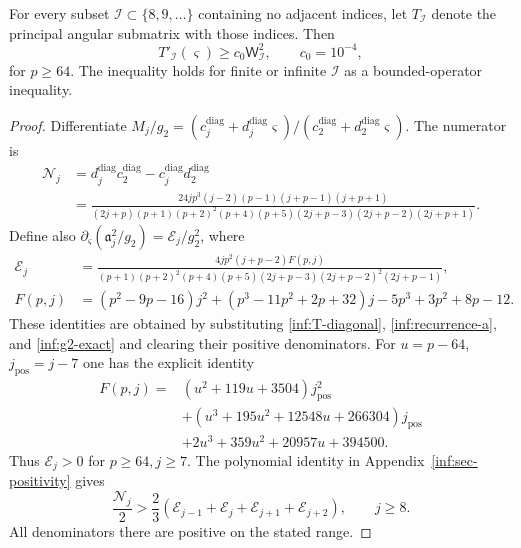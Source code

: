 \begin{lemma}\label{inf:angular-positive}
For every subset $\mathcal I\subset\{8,9,\ldots\}$ containing no
adjacent indices, let $T_{\mathcal I}$ denote the principal angular
submatrix with those indices. Then
\begin{equation}\label{inf:angular-positive-bound}
 T'_{\mathcal I}(\varsigma)\ge c_0\mathsf W_{\mathcal I}^2,
 \qquad c_0=10^{-4},
\end{equation}
for $p\ge64$. The inequality holds for
finite or infinite $\mathcal I$ as a bounded-operator inequality.
\end{lemma}
\begin{proof}
Differentiate
$M_j/g_2=(c_j^{\mathrm{diag}}+d_j^{\mathrm{diag}}\varsigma)/
(c_2^{\mathrm{diag}}+d_2^{\mathrm{diag}}\varsigma)$.
The numerator is
\begin{align}
 \mathcal N_j&=d_j^{\mathrm{diag}}c_2^{\mathrm{diag}}
                    -c_j^{\mathrm{diag}}d_2^{\mathrm{diag}}\nonumber\\
 &=\frac{24jp^3(j-2)(p-1)(j+p-1)(j+p+1)}
 {(2j+p)(p+1)(p+2)^2(p+4)(p+5)
  (2j+p-3)(2j+p-2)(2j+p+1)}.
 \label{inf:N-angular}
\end{align}
Define also $\partial_\varsigma(\mathfrak a_j^2/g_2)
=\mathcal E_j/g_2^2$, where
\begin{align}
 \mathcal E_j&=\frac{4jp^2(j+p-2)F(p,j)}
 {(p+1)(p+2)^2(p+4)(p+5)(2j+p-3)(2j+p-2)^2(2j+p-1)},
 \label{inf:E-angular}\\
 F(p,j)&=(p^2-9p-16)j^2+(p^3-11p^2+2p+32)j
                         -5p^3+3p^2+8p-12.\nonumber
\end{align}
These identities are obtained by substituting
\eqref{inf:T-diagonal}, \eqref{inf:recurrence-a}, and
\eqref{inf:g2-exact} and clearing their positive denominators.
For $u=p-64$, $j_{\mathrm{pos}}=j-7$ one has the explicit identity
\begin{align*}
 F(p,j)={}&(u^2+119u+3504)j_{\mathrm{pos}}^2\\
 &+(u^3+195u^2+12548u+266304)j_{\mathrm{pos}}\\
 &+2u^3+359u^2+20957u+394500.
\end{align*}
Thus $\mathcal E_j>0$ for $p\ge64,j\ge7$.
The polynomial identity in Appendix~\ref{inf:sec-positivity} gives
\begin{equation}\label{inf:half-diagonal}
 \frac{\mathcal N_j}{2}
 >\frac23(\mathcal E_{j-1}+\mathcal E_j+
                 \mathcal E_{j+1}+\mathcal E_{j+2}),\qquad j\ge8.
\end{equation}
All denominators there are positive on the stated range.


\end{proof}
